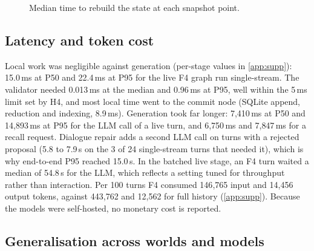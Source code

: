 \documentclass[letterpaper,journal,onecolumn]{IEEEtran}
\begin{document}
\begin{figure}[!htbp]
\centering
{}
\caption{Median time to rebuild the state at each snapshot point.}
\label{fig:replay}
\end{figure}

\subsection{Latency and token cost}\label{sec:latency}

Local work was negligible against generation (per-stage values in \cref{app:supp}): 15.0\,ms at P50 and 22.4\,ms at P95 for the live F4 graph run single-stream. The validator needed 0.013\,ms at the median and 0.96\,ms at P95, well within the 5\,ms limit set by H4, and most local time went to the commit node (SQLite append, reduction and indexing, 8.9\,ms). Generation took far longer: 7{,}410\,ms at P50 and 14{,}893\,ms at P95 for the LLM call of a live turn, and 6{,}750\,ms and 7{,}847\,ms for a recall request. Dialogue repair adds a second LLM call on turns with a rejected proposal (5.8 to 7.9\,s on the 3 of 24 single-stream turns that needed it), which is why end-to-end P95 reached 15.0\,s. In the batched live stage, an F4 turn waited a median of 54.8\,s for the LLM, which reflects a setting tuned for throughput rather than interaction. Per 100 turns F4 consumed 146{,}765 input and 14{,}456 output tokens, against 443{,}762 and 12{,}562 for full history (\cref{app:supp}). Because the models were self-hosted, no monetary cost is reported.

\subsection{Generalisation across worlds and models}\label{sec:general-ext}
\end{document}
